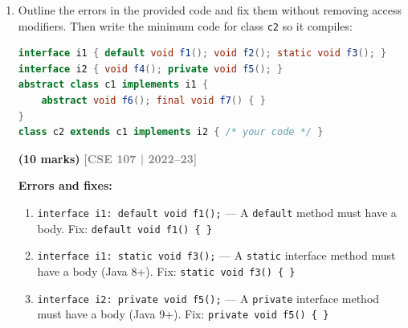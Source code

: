 \documentclass[12pt,a3paper]{article}
\newcommand{\yr}[1]{\hfill\textcolor{gray}{\small\textbf{[#1]}}}
\newcommand{\mk}[1]{\textcolor{orange!70!black}{\small\textbf{(#1 marks)}}}
\begin{document}
\begin{enumerate}
\begin{tcolorbox}
\medskip
\textbf{Fixed \texttt{main} method:}

\begin{lstlisting}[language=Java]
class Test {
    public static void main(String[] args) {
        X obX = new X();
        obX.display();
        obX.showNested();

        X.Y obY = obX.new Y();  // inner class: needs outer object
        obY.display();

        X.Z obZ = new X.Z();    // static nested: no outer object needed
        obZ.display();
    }
}
\end{lstlisting}

\end{tcolorbox}



\item Outline the errors in the provided code and fix them without removing access modifiers. Then write the minimum code for class \texttt{c2} so it compiles:
\begin{lstlisting}[language=Java]
interface i1 { default void f1(); void f2(); static void f3(); }
interface i2 { void f4(); private void f5(); }
abstract class c1 implements i1 {
    abstract void f6(); final void f7() { }
}
class c2 extends c1 implements i2 { /* your code */ }
\end{lstlisting}
\mk{10}
\yr{CSE 107 | 2022--23}

\begin{tcolorbox}[enhanced,breakable,ansbox,
  colback=cD!4,colframe=cD,boxrule=0.8pt,arc=5pt,
  title={\textbf{Answer --- Fix Errors in Interfaces \& Write \texttt{c2}}},
  fonttitle=\bfseries\color{white},colbacktitle=cD]

\textbf{Errors and fixes:}

\begin{enumerate}[label=\textbf{\arabic*.}]
  \item \texttt{interface i1: default void f1();} ---
    A \texttt{default} method must have a body.
    Fix: \texttt{default void f1() \{ \}}

  \item \texttt{interface i1: static void f3();} ---
    A \texttt{static} interface method must have a body (Java 8+).
    Fix: \texttt{static void f3() \{ \}}

  \item \texttt{interface i2: private void f5();} ---
    A \texttt{private} interface method must have a body (Java 9+).
    Fix: \texttt{private void f5() \{ \}}
\end{enumerate}


\end{tcolorbox}
\end{enumerate}
\end{document}
